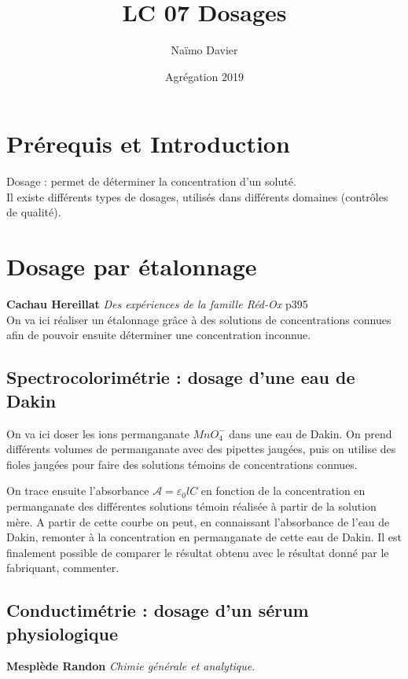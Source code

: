 \documentclass[12pt,prb,aps,epsf]{article}
\begin{document}
	
	\title{LC 07 Dosages}
	\author{Naïmo Davier}
	\date{Agrégation 2019}
	
	\maketitle
	
	\tableofcontents
	
	\pagebreak
	


\section{Prérequis et Introduction}
Dosage : permet de déterminer la concentration d'un soluté.\\
Il existe différents types de dosages, utilisés dans différents domaines (contrôles de qualité).

\section{Dosage par étalonnage}
\textbf{Cachau Hereillat} \textit{Des expériences de la famille Réd-Ox} p395\\

On va ici réaliser un étalonnage grâce à des solutions de concentrations connues afin de pouvoir ensuite déterminer une concentration inconnue.

\subsection{Spectrocolorimétrie : dosage d'une eau de Dakin}

On va ici doser les ions permanganate $MnO_4^-$ dans une eau de Dakin. On prend différents volumes de permanganate avec des pipettes jaugées, puis on utilise des fioles jaugées pour faire des solutions témoins de concentrations connues.

 On trace ensuite l'absorbance $\mathcal{A} = \varepsilon_0 l C$ en fonction de la concentration en permanganate des différentes solutions témoin réalisée à partir de la solution mère. A partir de cette courbe on peut, en connaissant l'absorbance de l'eau de Dakin, remonter à la concentration en permanganate de cette eau de Dakin. Il est finalement possible de comparer le résultat obtenu avec le résultat donné par le fabriquant, commenter.
 
 \subsection{Conductimétrie : dosage d'un sérum physiologique}
 \textbf{Mesplède Randon} \textit{Chimie générale et analytique}.\\
 
\end{document}
